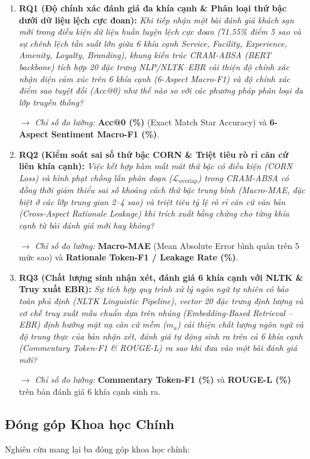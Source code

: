\documentclass[pdflatex,sn-mathphys-num]{sn-jnl}
\theoremstyle{thmstyleone}
\theoremstyle{thmstyletwo}
\theoremstyle{thmstylethree}
\begin{document}
\begin{enumerate}
    \item \textbf{RQ1 (Độ chính xác đánh giá đa khía cạnh \& Phân loại thứ bậc dưới dữ liệu lệch cực đoan):} \textit{Khi tiếp nhận một bài đánh giá khách sạn mới trong điều kiện dữ liệu huấn luyện lệch cực đoan (71.55\% điểm 5 sao và sự chênh lệch tần suất lớn giữa 6 khía cạnh Service, Facility, Experience, Amenity, Loyalty, Branding), khung kiến trúc CRAM-ABSA (BERT backbone) tích hợp 20 đặc trưng NLP/NLTK--EBR cải thiện độ chính xác nhận diện cảm xúc trên 6 khía cạnh (6-Aspect Macro-F1) và độ chính xác điểm sao tuyệt đối (Acc@0) như thế nào so với các phương pháp phân loại đa lớp truyền thống?}
    
    $\rightarrow$ \textit{Chỉ số đo lường:} \textbf{Acc@0 (\%)} (Exact Match Star Accuracy) và \textbf{6-Aspect Sentiment Macro-F1 (\%)}.

    \item \textbf{RQ2 (Kiểm soát sai số thứ bậc CORN \& Triệt tiêu rò rỉ căn cứ liên khía cạnh):} \textit{Việc kết hợp hàm mất mát thứ bậc có điều kiện (CORN Loss) và hình phạt chồng lấn phân đoạn ($\mathcal{L}_{\text{overlap}}$) trong CRAM-ABSA có đồng thời giảm thiểu sai số khoảng cách thứ bậc trung bình (Macro-MAE, đặc biệt ở các lớp trung gian 2--4 sao) và triệt tiêu tỷ lệ rò rỉ căn cứ văn bản (Cross-Aspect Rationale Leakage) khi trích xuất bằng chứng cho từng khía cạnh từ bài đánh giá mới hay không?}
    
    $\rightarrow$ \textit{Chỉ số đo lường:} \textbf{Macro-MAE} (Mean Absolute Error bình quân trên 5 mức sao) và \textbf{Rationale Token-F1 / Leakage Rate (\%)}.

    \item \textbf{RQ3 (Chất lượng sinh nhận xét, đánh giá 6 khía cạnh với NLTK \& Truy xuất EBR):} \textit{Sự tích hợp quy trình xử lý ngôn ngữ tự nhiên có bảo toàn phủ định (NLTK Linguistic Pipeline), vector 20 đặc trưng định lượng và cơ chế truy xuất mẫu chuẩn dựa trên nhúng (Embedding-Based Retrieval -- EBR) định hướng mặt nạ căn cứ mềm ($m_a$) cải thiện chất lượng ngôn ngữ và độ trung thực của bản nhận xét, đánh giá tự động sinh ra trên cả 6 khía cạnh (Commentary Token-F1 \& ROUGE-L) ra sao khi đưa vào một bài đánh giá mới?}
    
    $\rightarrow$ \textit{Chỉ số đo lường:} \textbf{Commentary Token-F1 (\%)} và \textbf{ROUGE-L (\%)} trên bản đánh giá 6 khía cạnh sinh ra.
\end{enumerate}

\subsection{Đóng góp Khoa học Chính}
\label{subsec:key_contributions}
Nghiên cứu mang lại ba đóng góp khoa học chính:
\end{document}
